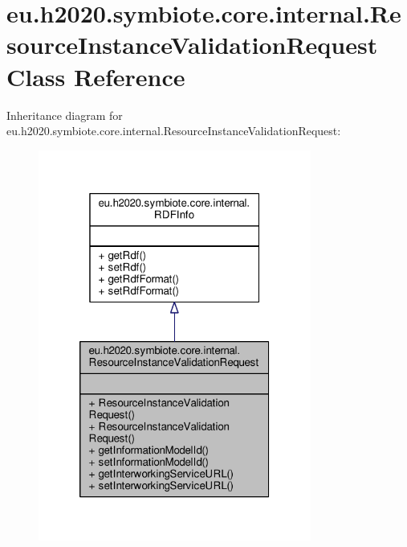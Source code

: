 \hypertarget{classeu_1_1h2020_1_1symbiote_1_1core_1_1internal_1_1ResourceInstanceValidationRequest}{}\section{eu.\+h2020.\+symbiote.\+core.\+internal.\+Resource\+Instance\+Validation\+Request Class Reference}
\label{classeu_1_1h2020_1_1symbiote_1_1core_1_1internal_1_1ResourceInstanceValidationRequest}


Inheritance diagram for eu.\+h2020.\+symbiote.\+core.\+internal.\+Resource\+Instance\+Validation\+Request\+:
\nopagebreak
\begin{figure}[H]
\begin{center}
\leavevmode
\includegraphics[width=254pt]{classeu_1_1h2020_1_1symbiote_1_1core_1_1internal_1_1ResourceInstanceValidationRequest__inherit__graph}
\end{center}
\end{figure}


